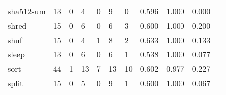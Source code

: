 \begin{longtable}{lp{1.2cm}p{1.2cm}p{1.2cm}p{1.2cm}p{1.2cm}p{1.2cm}p{1.2cm}p{1.2cm}p{1.2cm}p{1.2cm}}
sha512sum &                                    13 &                                                  0 &                                                  4 &                                                  0 &                                                  9 &                                                  0 &                                         0.596 &                                              1.000 &                                              0.000 \\
shred     &                                    15 &                                                  0 &                                                  6 &                                                  0 &                                                  6 &                                                  3 &                                         0.600 &                                              1.000 &                                              0.200 \\
shuf      &                                    15 &                                                  0 &                                                  4 &                                                  1 &                                                  8 &                                                  2 &                                         0.633 &                                              1.000 &                                              0.133 \\
sleep     &                                    13 &                                                  0 &                                                  6 &                                                  0 &                                                  6 &                                                  1 &                                         0.538 &                                              1.000 &                                              0.077 \\
sort      &                                    44 &                                                  1 &                                                 13 &                                                  7 &                                                 13 &                                                 10 &                                         0.602 &                                              0.977 &                                              0.227 \\
split     &                                    15 &                                                  0 &                                                  5 &                                                  0 &                                                  9 &                                                  1 &                                         0.600 &                                              1.000 &                                              0.067 \\

\end{longtable}
